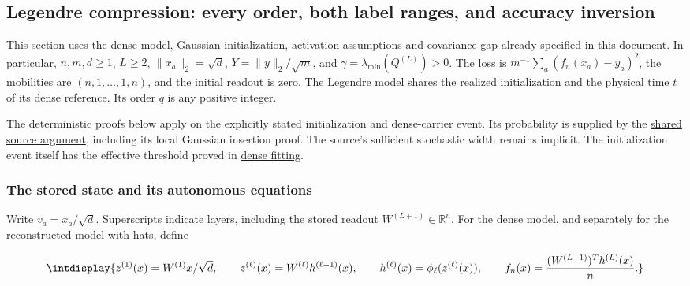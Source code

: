 \subsection{Legendre compression: every order, both label ranges, and accuracy inversion}
\label{int:legendre-compression}


This section uses the dense model, Gaussian initialization, activation assumptions and covariance gap already specified in this document. In particular, \(n,\allowbreak m,\allowbreak d\ge1\), \(L\ge2\), \(\|x_a\|_2=\sqrt d\), \(Y=\|y\|_2/\sqrt m\), and \(\gamma=\lambda_{\min}(Q^{(L)})>0\). The loss is \(m^{-1}\sum_a(f_n(x_a)-y_a)^2\), the mobilities are \((n,\allowbreak 1,\allowbreak \ldots,\allowbreak 1,\allowbreak n)\), and the initial readout is zero. The Legendre model shares the realized initialization and the physical time \(t\) of its dense reference. Its order \(q\) is any positive integer.



The deterministic proofs below apply on the explicitly stated initialization and dense-carrier event. Its probability is supplied by the \hyperref[int:source-foundations]{shared source argument}, including its local Gaussian insertion proof. The source's sufficient stochastic width remains implicit. The initialization event itself has the effective threshold proved in \hyperref[int:dense-fitting]{dense fitting}.


\subsubsection{The stored state and its autonomous equations}
\label{int:legendre-runtime}


Write \(v_a=x_a/\sqrt d\). Superscripts indicate layers, including the stored readout \(W^{(L+1)}\in\mathbb R^n\). For the dense model, and separately for the reconstructed model with hats, define


\begingroup\renewcommand{\theHequation}{intdisplay.98}
\begin{equation*}
\intdisplay{
z^{(1)}(x)=W^{(1)}x/\sqrt d,\qquad
z^{(\ell)}(x)=W^{(\ell)}h^{(\ell-1)}(x),\qquad
h^{(\ell)}(x)=\phi_\ell(z^{(\ell)}(x)),\qquad
f_n(x)=\frac{(W^{(L+1)})^Th^{(L)}(x)}n.
}
\end{equation*}
\endgroup

